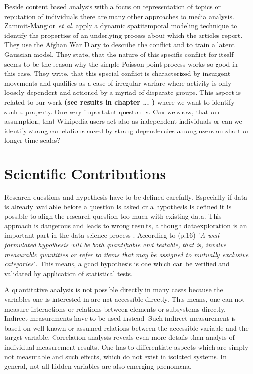 \documentclass[a4paper,10pt]{scrbook}
\begin{document}
Beside content based analysis with a focus on representation of topics or reputation of individuals there are many other approaches to media analysis. Zammit-Mangion \textit{et al.} \cite{Zammit-Mangion2012} apply a dynamic spatitemporal modeling technique to identify the properties of an underlying process about which the articles report. They use the Afghan War Diary to describe the conflict and to train a latent Gaussian model. They state, that the nature of this specific conflict for itself seems to be the reason why the simple Poisson point process works so good in this case. They write, that this special conflict is characterized by insurgent movements and qualifies as a case of irregular warfare where activity is only loosely dependent and actioned by a myriad of disparate groups. 
This aspect is related to our work \textbf{(see results in chapter ... )} where we want to identify such a property. One very importatnt queston is: Can we show, that our assumption, that Wikipedia users act also as independent individuals or can we identify strong correlations cused by strong dependencies among users on short or longer time scales?  
  
\section{Scientific Contributions}
%
%

Research questions and hypothesis have to be defined carefully. Especially if data is already available before a question is asked or a hypothesis is defined it is possible to align the research question too much with existing data. 
This approach is dangerous and leads to wrong results, although dataexploration is an important part in the data science process \cite{ONeil2013}. According to \cite{Good2012} (p.16) "\textit{A well-formulated hypothesis will be both quantifiable and testable, that is, involve measurable quantities or refer to items that may be assigned to mutually exclusive categories}". This means, a good hypothesis is one which can be verified and validated by application of statistical tests. 

A quantitative analysis is not possible directly in many cases because the variables one is interested in are not accessible directly. This means, one can not measure interactions or relations between elements or subsystems directly. Indirect measurements have to be used instead. Such indirect measurement is based on well known or assumed relations between the accessible variable and the target variable. Correlation analysis reveals even more details than analyis of individual measurement results. One has to differentiate aspects which are simply not measurable and such effects, which do not exist in isolated systems. In general, not all hidden variables are also emerging phenomena.
\end{document}
